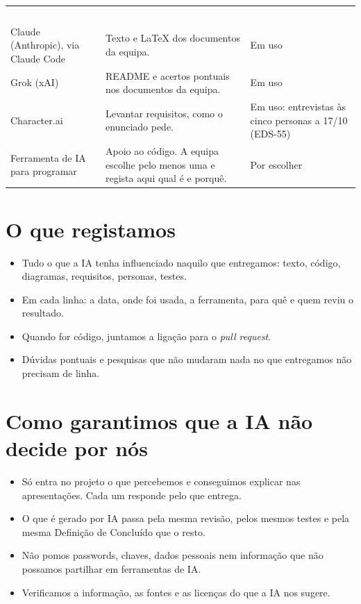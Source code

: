 \documentclass[11pt,a4paper]{article}
\newcommand{\th}[1]{\textcolor{white}{\sffamily\bfseries #1}}
\begin{document}
\small
\renewcommand{\arraystretch}{1.5}
\begin{tabularx}{\textwidth}{N{4.4cm} Y L{3.2cm}}
   \th{Ferramenta} & \th{Para que a usamos} & \th{Estado} \\
  Claude (Anthropic), via Claude Code & Texto e LaTeX dos documentos da equipa. & Em uso \\
  Grok (xAI) & README e acertos pontuais nos documentos da equipa. & Em uso \\
  Character.ai & Levantar requisitos, como o enunciado pede. & Em uso: entrevistas às cinco personas a 17/10 (EDS-55) \\
  Ferramenta de IA para programar & Apoio ao código. A equipa escolhe pelo menos uma e regista aqui qual é e porquê. & Por escolher \\
  \bottomrule
\end{tabularx}
\renewcommand{\arraystretch}{1}
\normalsize

\section{O que registamos}

\begin{itemize}
  \item Tudo o que a IA tenha influenciado naquilo que entregamos: texto, código, diagramas, requisitos, personas, testes.
  \item Em cada linha: a data, onde foi usada, a ferramenta, para quê e quem reviu o resultado.
  \item Quando for código, juntamos a ligação para o \textit{pull request}.
  \item Dúvidas pontuais e pesquisas que não mudaram nada no que entregamos não precisam de linha.
\end{itemize}

\section{Como garantimos que a IA não decide por nós}

\begin{itemize}
  \item Só entra no projeto o que percebemos e conseguimos explicar nas apresentações. Cada um responde pelo que entrega.
  \item O que é gerado por IA passa pela mesma revisão, pelos mesmos testes e pela mesma Definição de Concluído que o resto.
  \item Não pomos passwords, chaves, dados pessoais nem informação que não possamos partilhar em ferramentas de IA.
  \item Verificamos a informação, as fontes e as licenças do que a IA nos sugere.
\end{itemize}
\end{document}
